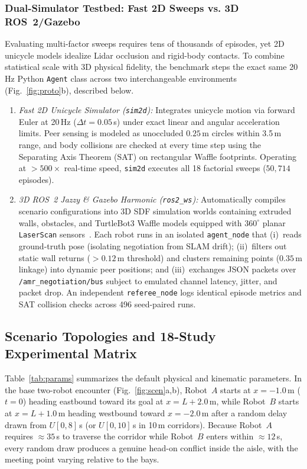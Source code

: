 \subsubsection{Dual-Simulator Testbed: Fast 2D Sweeps vs. 3D ROS~2/Gazebo}
Evaluating multi-factor sweeps requires tens of thousands of episodes, yet 2D unicycle models idealize Lidar occlusion and rigid-body contacts. To combine statistical scale with 3D physical fidelity, the benchmark steps the exact same 20\,Hz Python \texttt{Agent} class across two interchangeable environments (Fig.~\ref{fig:proto}b), described below.
\begin{enumerate}
\item \emph{Fast 2D Unicycle Simulator (\texttt{sim2d}):} 
Integrates unicycle motion via forward Euler at 20\,Hz ($\Delta t = 0.05$\,s) under exact linear and angular acceleration limits. Peer sensing is modeled as unoccluded $0.25$\,m circles within 3.5\,m range, and body collisions are checked at every time step using the Separating Axis Theorem (SAT) on rectangular Waffle footprints. Operating at $>500\times$ real-time speed, \texttt{sim2d} executes all 18 factorial sweeps ($50{,}714$ episodes).
\item \emph{3D ROS~2 Jazzy \& Gazebo Harmonic (\texttt{ros2\_ws}):} 
Automatically compiles scenario configurations into 3D SDF simulation worlds containing extruded walls, obstacles, and TurtleBot3 Waffle models equipped with $360^\circ$ planar \texttt{LaserScan} sensors~\cite{turtlebot3,gazebosim}. Each robot runs in an isolated \texttt{agent\_node} that 
(i)~reads ground-truth pose (isolating negotiation from SLAM drift); 
(ii)~filters out static wall returns ($>0.12$\,m threshold) and clusters remaining points ($0.35$\,m linkage) into dynamic peer positions; and 
(iii)~exchanges JSON packets over \texttt{/amr\_negotiation/bus} subject to emulated channel latency, jitter, and packet drop. 
An independent \texttt{referee\_node} logs identical episode metrics and SAT collision checks across 496 seed-paired runs.
\end{enumerate}

\subsection{Scenario Topologies and 18-Study Experimental Matrix}
Table~\ref{tab:params} summarizes the default physical and kinematic parameters. In the base two-robot encounter (Fig.~\ref{fig:scen}a,b), Robot~$A$ starts at $x = -1.0$\,m ($t = 0$) heading eastbound toward its goal at $x = L + 2.0$\,m, while Robot~$B$ starts at $x = L + 1.0$\,m heading westbound toward $x = -2.0$\,m after a random delay drawn from $U[0, 8]$\,s (or $U[0, 10]$\,s in 10\,m corridors). Because Robot~$A$ requires $\approx 35$\,s to traverse the corridor while Robot~$B$ enters within $\approx 12$\,s, every random draw produces a genuine head-on conflict inside the aisle, with the meeting point varying relative to the bays.

